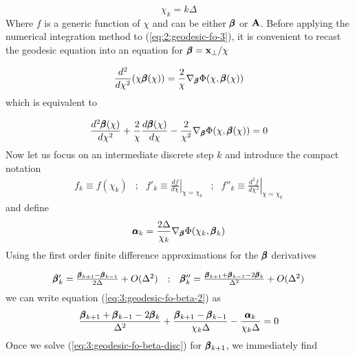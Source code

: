 \begin{equation}
\label{eq:3:int-steps}
\chi_k = k\Delta
\end{equation}  
%
Where $f$ is a generic function of $\chi$ and can be either $\pmb{\beta}$ or $\mathbf{A}$. Before applying the numerical integration method to (\ref{eq:2:geodesic-fo-3}), it is convenient to recast the geodesic equation into an equation for $\pmb{\beta}=\mathbf{x}_\perp/\chi$ 

\begin{equation}
\label{eq:3:geodesic-fo-beta-1}
\frac{d^2}{d\chi^2}(\chi\pmb{\beta}(\chi)) = \frac{2}{\chi}\nabla_{\pmb{\beta}}\Phi(\chi,\pmb{\beta}(\chi))
\end{equation} 
%
which is equivalent to 

\begin{equation}
\label{eq:3:geodesic-fo-beta-2}
\frac{d^2\pmb{\beta}(\chi)}{d\chi^2} + \frac{2}{\chi}\frac{d\pmb{\beta}(\chi)}{d\chi} - \frac{2}{\chi^2}\nabla_{\pmb{\beta}}\Phi(\chi,\pmb{\beta}(\chi)) = 0
\end{equation}
%
Now let us focus on an intermediate discrete step $k$ and introduce the compact notation 
\begin{equation}
\label{eq:3:compactnotation}
\begin{matrix}
f_k\equiv f(\chi_k) & ; & f'_k\equiv\left.\frac{df}{d\chi}\right\vert_{\chi=\chi_k} & ; & f''_k\equiv\left.\frac{d^2f}{d\chi^2}\right\vert_{\chi=\chi_k}
\end{matrix}
\end{equation}  
%
and define
\begin{equation}
\label{eq:3:alphak}
\pmb{\alpha}_k = \frac{2\Delta}{\chi_k}\nabla_{\pmb{\beta}}\Phi(\chi_k,\pmb{\beta}_k)
\end{equation}
%
Using the first order finite difference approximations for the $\pmb{\beta}$ derivatives

\begin{equation}
\label{eq:3:finitediff}
\begin{matrix}
\pmb{\beta}'_k = \frac{\pmb{\beta}_{k+1}-\pmb{\beta}_{k-1}}{2\Delta} + O(\Delta^2) & ; & \pmb{\beta}''_k = \frac{\pmb{\beta}_{k+1}+\pmb{\beta}_{k-1}-2\pmb{\beta}_k}{\Delta^2} + O(\Delta^2)
\end{matrix}
\end{equation}
%
we can write equation (\ref{eq:3:geodesic-fo-beta-2}) as 
\begin{equation}
\label{eq:3:geodesic-fo-beta-disc}
\frac{\pmb{\beta}_{k+1}+\pmb{\beta}_{k-1}-2\pmb{\beta}_k}{\Delta^2} + \frac{\pmb{\beta}_{k+1}-\pmb{\beta}_{k-1}}{\chi_k\Delta} - \frac{\pmb{\alpha}_k}{\chi_k\Delta} = 0
\end{equation} 
%
Once we solve (\ref{eq:3:geodesic-fo-beta-disc}) for $\pmb{\beta}_{k+1}$, we immediately find

